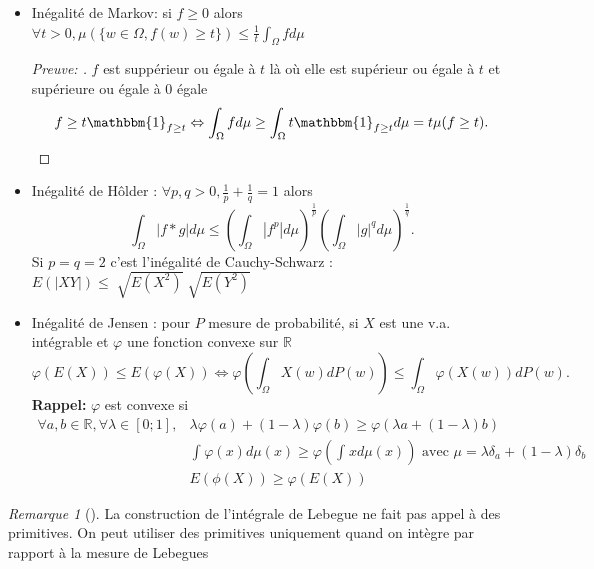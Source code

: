 \documentclass{article}
\theoremstyle{plain}%
\theoremstyle{definition}
\theoremstyle{remark}
\newtheorem*{rem}{Remarque}
\begin{document}
\begin{itemize}
    \item Inégalité de Markov: si $ f \geq 0 $ alors $ \forall t > 0, \mu (\{w \in \Omega , f(w) \geq t\}) \leq  \frac{1}{t}\int_{\Omega }^{}f d \mu  $ \begin{proof}[Preuve: ]
        $ f $ est suppérieur ou égale à $ t $ là où elle est supérieur ou égale à $ t $ et supérieure ou égale à 0 égale 
        \[
            f \geq t \mathbbm{1}_{f \geq t} \Leftrightarrow \int_{\Omega }^{}f d \mu \geq \int_{\Omega }^{}t \mathbbm{1}_{f \geq t}d \mu = t \mu ({f \geq t})
        .\]        
    \end{proof}
    \item Inégalité de Hôlder : $ \forall p,q > 0, \frac{1}{p}+\frac{1}{q} = 1 $ alors 
    \[
        \int_{\Omega }^{}\left| f*g \right| d \mu \leq (\int_{\Omega }^{}\left| f^p \right|  d \mu )^\frac{1}{p}(\int_{\Omega }^{} \left| g \right| ^q d \mu )^{\frac{1}{q}}
    .\]
    Si $ p=q=2 $ c'est l'inégalité de Cauchy-Schwarz : $ E(\left| XY \right| ) \leq \sqrt[]{E(X^2)} \sqrt[]{E(Y^2)}$ 
    \item Inégalité de Jensen : pour $ P $ mesure de probabilité, si $ X $ est une v.a. intégrable et $ \varphi $ une fonction convexe sur $ \mathbb{R} $ 
    \[
        \varphi (E(X)) \leq E(\varphi (X)) \Leftrightarrow \varphi (\int_{\Omega }^{}X(w)dP(w)) \leq \int_{\Omega }^{}\varphi (X(w))dP(w)
    .\]
    \textbf{Rappel:} $ \varphi  $ est convexe si \begin{align*}
        \forall a,b \in \mathbb{R}, \forall \lambda \in [0;1], &\lambda \varphi (a)+(1-\lambda )\varphi (b) \geq \varphi (\lambda a + (1-\lambda )b) \\ 
        & \int_{}^{} \varphi (x)d \mu (x) \geq \varphi (\int_{}^{}xd \mu (x)) \text{ avec } \mu = \lambda \delta _a + (1-\lambda )\delta _b\\
        & E(\phi (X)) \geq \varphi (E(X)) 
    \end{align*}
\end{itemize}
\begin{rem}[]
    La construction de l'intégrale de Lebegue ne fait pas appel à des primitives. On peut utiliser des primitives uniquement quand on intègre par rapport à la mesure de Lebegues 
\end{rem}
    
\end{document}
